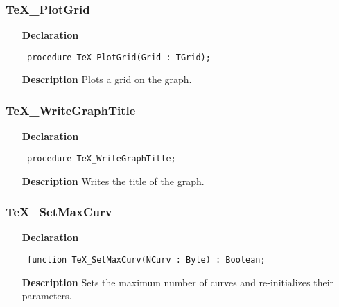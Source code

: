 \documentclass[12pt,a4paper,oneside]{report}
\newcommand{\declarationitem}[1]{\textbf{#1}}
\newcommand{\descriptiontitle}[1]{\textbf{#1}}
\newcommand{\code}[1]{\texttt{#1}}
\begin{document}
\subsubsection{TeX{\_}PlotGrid}
\label{utexplot-TeX_PlotGrid}
\begin{itemize}\item[\declarationitem{Declaration}\hfill]
	\begin{flushleft}
		\code{
			procedure TeX{\_}PlotGrid(Grid : TGrid);}
		
	\end{flushleft}
	
	\par
	\item[\descriptiontitle{Description}]
	Plots a grid on the graph.
	
\end{itemize}
\subsubsection{TeX{\_}WriteGraphTitle}
\label{utexplot-TeX_WriteGraphTitle}
\begin{itemize}\item[\declarationitem{Declaration}\hfill]
	\begin{flushleft}
		\code{
			procedure TeX{\_}WriteGraphTitle;}
		
	\end{flushleft}
	
	\par
	\item[\descriptiontitle{Description}]
	Writes the title of the graph.
	
\end{itemize}
\subsubsection{TeX{\_}SetMaxCurv}
\label{utexplot-TeX_SetMaxCurv}
\begin{itemize}\item[\declarationitem{Declaration}\hfill]
	\begin{flushleft}
		\code{
			function TeX{\_}SetMaxCurv(NCurv : Byte) : Boolean;}
		
	\end{flushleft}
	
	\par
	\item[\descriptiontitle{Description}]
	Sets the maximum number of curves and re{-}initializes their parameters.
	
\end{itemize}
\end{document}
